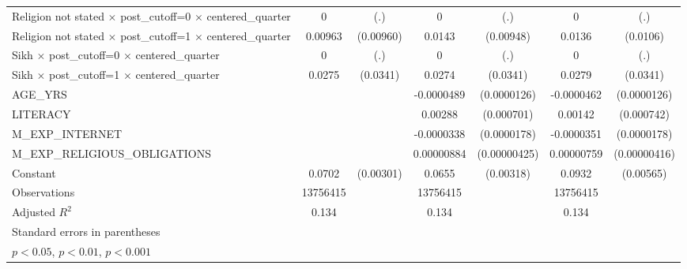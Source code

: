 \begin{table}[htbp]
\begin{tabular}{l*{3}{cc}}
Religion not stated $\times$ post\_cutoff=0 $\times$ centered\_quarter&           0         &         (.)&           0         &         (.)&           0         &         (.)\\
Religion not stated $\times$ post\_cutoff=1 $\times$ centered\_quarter&     0.00963         &   (0.00960)&      0.0143         &   (0.00948)&      0.0136         &    (0.0106)\\
Sikh $\times$ post\_cutoff=0 $\times$ centered\_quarter&           0         &         (.)&           0         &         (.)&           0         &         (.)\\
Sikh $\times$ post\_cutoff=1 $\times$ centered\_quarter&      0.0275         &    (0.0341)&      0.0274         &    (0.0341)&      0.0279         &    (0.0341)\\
AGE\_YRS             &                     &            &  -0.0000489\sym{***}& (0.0000126)&  -0.0000462\sym{***}& (0.0000126)\\
LITERACY            &                     &            &     0.00288\sym{***}&  (0.000701)&     0.00142         &  (0.000742)\\
M\_EXP\_INTERNET      &                     &            &  -0.0000338         & (0.0000178)&  -0.0000351\sym{*}  & (0.0000178)\\
M\_EXP\_RELIGIOUS\_OBLIGATIONS&                     &            &  0.00000884\sym{*}  &(0.00000425)&  0.00000759         &(0.00000416)\\
Constant            &      0.0702\sym{***}&   (0.00301)&      0.0655\sym{***}&   (0.00318)&      0.0932\sym{***}&   (0.00565)\\
\hline
Observations        &    13756415         &            &    13756415         &            &    13756415         &            \\
Adjusted \(R^{2}\)  &       0.134         &            &       0.134         &            &       0.134         &            \\
\hline\hline
\multicolumn{7}{l}{\footnotesize Standard errors in parentheses}\\
\multicolumn{7}{l}{\footnotesize \sym{*} \(p<0.05\), \sym{**} \(p<0.01\), \sym{***} \(p<0.001\)}\\
\end{tabular}
\end{table}
